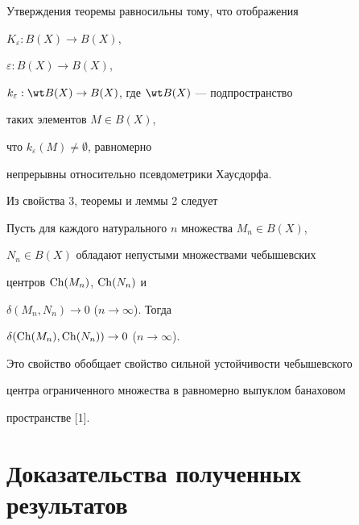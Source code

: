 \begin{note}


Утверждения теоремы равносильны тому, что отображения 


$K_{\varepsilon } : B(X) \to B(X)$,


$\varepsilon : B(X) \to B(X)$,


$k_{\varepsilon } : \wt B(X) \to B(X)$, где $ \wt B(X)$ --- подпространство 


таких элементов $M \in B(X)$,


что $k_{\varepsilon }(M) \neq \emptyset $, равномерно


непрерывны относительно псевдометрики Хаусдорфа.


\end{note}





Из свойства 3, теоремы и леммы 2 следует





\begin{cornonum}


Пусть для каждого натурального $n$ множества $M_{n} \in B(X)$,


$N_{n} \in B(X)$ обладают непустыми множествами чебышевских


центров $\operatorname{Ch}(M_{n})$, $\operatorname{Ch}(N_{n})$ и 


$\delta (M_{n},N_{n}) \to 0$ ($n \to \infty $). Тогда 


$\delta (\operatorname{Ch}(M_{n}),\operatorname{Ch}(N_{n})) \to 0$ ($n \to \infty $).


\end{cornonum}





\begin{note}


Это свойство обобщает свойство сильной устойчивости чебышевского


центра ограниченного множества в равномерно выпуклом банаховом


пространстве [1].


\end{note}





\section{Доказательства полученных результатов}





